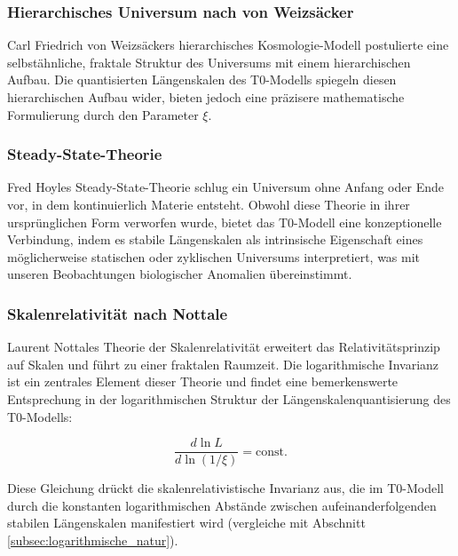 \documentclass[12pt,a4paper]{article}
\begin{document}
	\subsubsection{Hierarchisches Universum nach von Weizsäcker}
	\label{subsubsec:weizsaecker}
	
	Carl Friedrich von Weizsäckers hierarchisches Kosmologie-Modell \cite{weizsacker1951} postulierte eine selbstähnliche, fraktale Struktur des Universums mit einem hierarchischen Aufbau. Die quantisierten Längen\-skalen des T0-Modells spiegeln diesen hierarchischen Aufbau wider, bieten jedoch eine präzisere mathematische Formulierung durch den Parameter $\xi$.
	
	\subsubsection{Steady-State-Theorie}
	\label{subsubsec:steady_state}
	
	Fred Hoyles Steady-State-Theorie \cite{hoyle1948} schlug ein Universum ohne Anfang oder Ende vor, in dem kontinuierlich Materie entsteht. Obwohl diese Theorie in ihrer ursprünglichen Form verworfen wurde, bietet das T0-Modell eine konzeptionelle Verbindung, indem es stabile Längen\-skalen als intrinsische Eigenschaft eines möglicherweise statischen oder zyklischen Universums interpretiert, was mit unseren Beobachtungen biologischer Anomalien übereinstimmt.
	
	\subsubsection{Skalenrelativität nach Nottale}
	\label{subsubsec:nottale}
	
	Laurent Nottales Theorie der Skalenrelativität \cite{nottale1993} erweitert das Relativitätsprinzip auf Skalen und führt zu einer fraktalen Raumzeit. Die logarithmische Invarianz ist ein zentrales Element dieser Theorie und findet eine bemerkenswerte Entsprechung in der logarithmischen Struktur der Längen\-skalen\-quantisierung des T0-Modells:
	
	\begin{equation}
		\label{eq:skaleninvarianz}
		\frac{d\ln L}{d\ln(1/\xi)} = \text{const.}
	\end{equation}
	
	Diese Gleichung drückt die skalenrelativistische Invarianz aus, die im T0-Modell durch die konstanten logarithmischen Abstände zwischen aufeinanderfolgenden stabilen Längen\-skalen manifestiert wird (vergleiche mit Abschnitt \ref{subsec:logarithmische_natur}).
	
\end{document}
